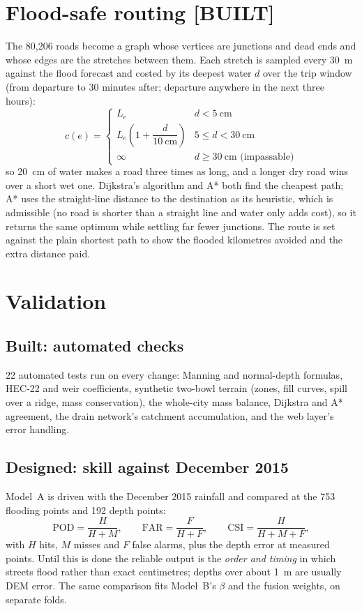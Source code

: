 \documentclass[11pt,a4paper]{article}
\newcommand{\built}{\textcolor{built}{\small\textbf{[BUILT]}}}
\begin{document}
\section{Flood-safe routing \built}

The 80,206 roads become a graph whose vertices are junctions and dead ends and whose
edges are the stretches between them. Each stretch is sampled every 30~m against the
flood forecast and costed by its deepest water $d$ over the trip window (from departure
to 30 minutes after; departure anywhere in the next three hours):
\begin{equation}
  c(e) =
  \begin{cases}
    L_e & d < 5\ \text{cm}\\[2pt]
    L_e\left(1 + \dfrac{d}{10\ \text{cm}}\right) & 5 \le d < 30\ \text{cm}\\[6pt]
    \infty & d \ge 30\ \text{cm (impassable)}
  \end{cases}
\end{equation}
so 20~cm of water makes a road three times as long, and a longer dry road wins over a
short wet one. Dijkstra's algorithm and A* both find the cheapest path; A* uses the
straight-line distance to the destination as its heuristic, which is admissible (no
road is shorter than a straight line and water only adds cost), so it returns the same
optimum while settling far fewer junctions. The route is set against the plain
shortest path to show the flooded kilometres avoided and the extra distance paid.

\section{Validation}

\subsection{Built: automated checks}
22 automated tests run on every change: Manning and normal-depth formulas, HEC-22 and
weir coefficients, synthetic two-bowl terrain (zones, fill curves, spill over a ridge,
mass conservation), the whole-city mass balance, Dijkstra and A* agreement, the drain
network's catchment accumulation, and the web layer's error handling.

\subsection{Designed: skill against December 2015}
Model~A is driven with the December 2015 rainfall and compared at the 753 flooding
points and 192 depth points:
\begin{equation}
  \text{POD} = \frac{H}{H+M},\qquad
  \text{FAR} = \frac{F}{H+F},\qquad
  \text{CSI} = \frac{H}{H+M+F},
\end{equation}
with $H$ hits, $M$ misses and $F$ false alarms, plus the depth error at measured
points. Until this is done the reliable output is the \emph{order and timing} in which
streets flood rather than exact centimetres; depths over about 1~m are usually DEM
error. The same comparison fits Model~B's $\beta$ and the fusion weights, on separate
folds.
\end{document}
